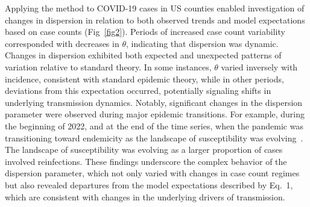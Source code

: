 \documentclass[11pt,letterpaper]{article}
\begin{document}
Applying the method to COVID-19 cases in US counties enabled investigation of changes in dispersion in relation to both observed trends and model expectations based on case counts (Fig~\ref{fig2}).  
Periods of increased case count variability corresponded with decreases in $\theta$, indicating that dispersion was dynamic. 
Changes in dispersion exhibited both expected and unexpected patterns of variation relative to standard theory.  
In some instances, $\theta$ varied inversely with incidence, consistent with standard epidemic theory, while in other periods, deviations from this expectation occurred, potentially signaling shifts in underlying transmission dynamics.  
Notably, significant changes in the dispersion parameter were observed during major epidemic transitions.
For example, during the beginning of 2022, and at the end of the time series, when the pandemic was transitioning toward endemicity as the landscape of susceptibility was evolving~\citep{lavine2021immunological}.  
The landscape of susceptibility was evolving as a larger proportion of cases involved reinfections.  
These findings underscore the complex behavior of the dispersion parameter, which not only varied with changes in case count regimes but also revealed departures from the model expectations described by Eq.~1, which are consistent with changes in the underlying drivers of transmission. 
\end{document}
